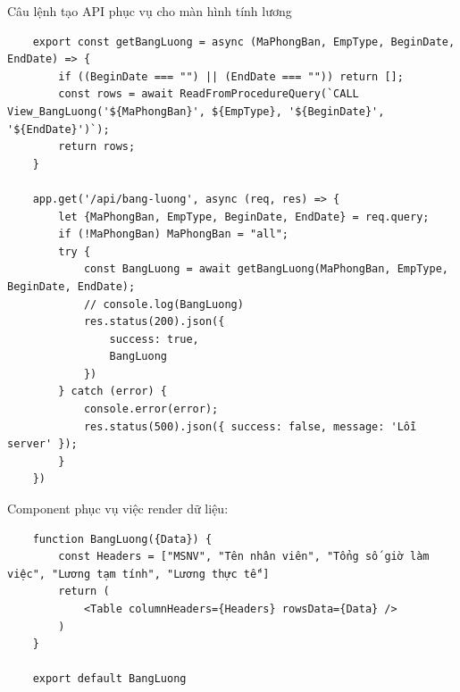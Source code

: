 \newpage
Câu lệnh tạo API phục vụ cho màn hình tính lương
\begin{verbatim}
    export const getBangLuong = async (MaPhongBan, EmpType, BeginDate, EndDate) => {
        if ((BeginDate === "") || (EndDate === "")) return [];
        const rows = await ReadFromProcedureQuery(`CALL View_BangLuong('${MaPhongBan}', ${EmpType}, '${BeginDate}', '${EndDate}')`);
        return rows;
    }

    app.get('/api/bang-luong', async (req, res) => {
        let {MaPhongBan, EmpType, BeginDate, EndDate} = req.query;
        if (!MaPhongBan) MaPhongBan = "all";
        try {
            const BangLuong = await getBangLuong(MaPhongBan, EmpType, BeginDate, EndDate);
            // console.log(BangLuong)
            res.status(200).json({
                success: true,
                BangLuong
            })
        } catch (error) {
            console.error(error);
            res.status(500).json({ success: false, message: 'Lỗi server' });
        }
    })
\end{verbatim}

Component phục vụ việc render dữ liệu:
\begin{verbatim}
    function BangLuong({Data}) {
        const Headers = ["MSNV", "Tên nhân viên", "Tổng số giờ làm việc", "Lương tạm tính", "Lương thực tế"]
        return (
            <Table columnHeaders={Headers} rowsData={Data} />
        )
    }

    export default BangLuong
\end{verbatim}

